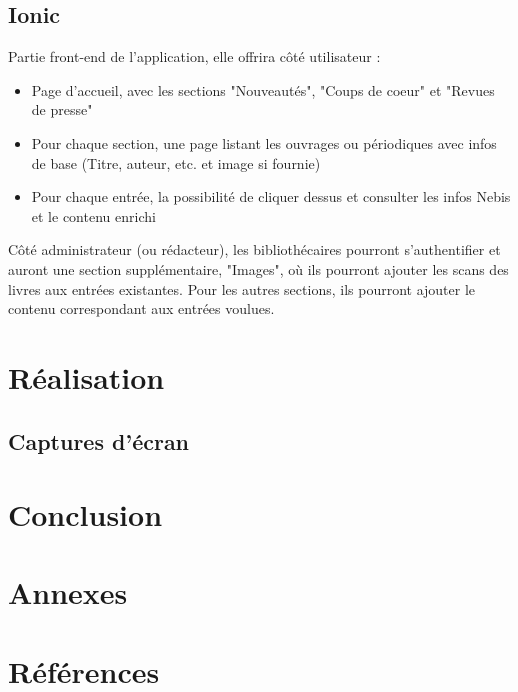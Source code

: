 \documentclass[a4paper, 12pt]{article}
\begin{document}
\subsection{Ionic}
Partie front-end de l'application, elle offrira côté utilisateur :
\begin{itemize}
    \item Page d'accueil, avec les sections "Nouveautés", "Coups de coeur" et "Revues de presse"
    \item Pour chaque section, une page listant les ouvrages ou périodiques avec infos de base
        (Titre, auteur, etc. et image si fournie)
    \item Pour chaque entrée, la possibilité de cliquer dessus et consulter les infos Nebis et le contenu enrichi
\end{itemize}
Côté administrateur (ou rédacteur), les bibliothécaires pourront s'authentifier et auront une section supplémentaire,
"Images", où ils pourront ajouter les scans des livres aux entrées existantes. Pour les autres sections, ils
pourront ajouter le contenu correspondant aux entrées voulues.


\section{Réalisation}
\subsection{Captures d'écran}

\section{Conclusion}

\section{Annexes}

\section{Références}


\end{document}
